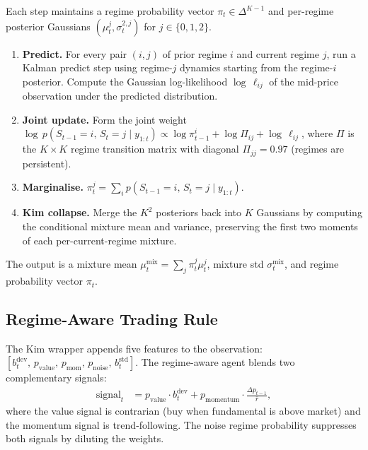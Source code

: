 \documentclass[11pt]{article}
\begin{document}
Each step maintains a regime probability vector
$\pi_t \in \Delta^{K-1}$ and per-regime posterior Gaussians
$(\mu_t^j, \sigma^{2,j}_t)$ for $j \in \{0,1,2\}$.

\begin{enumerate}[leftmargin=1.5em]
  \item \textbf{Predict.} For every pair $(i, j)$ of prior regime $i$ and
    current regime $j$, run a Kalman predict step using regime-$j$ dynamics
    starting from the regime-$i$ posterior.
    Compute the Gaussian log-likelihood $\log\,\ell_{ij}$ of the mid-price
    observation under the predicted distribution.
  \item \textbf{Joint update.} Form the joint weight
    $\log\,p(S_{t-1}=i,\, S_t=j \mid y_{1:t}) \propto
    \log\pi_{t-1}^i + \log\Pi_{ij} + \log\,\ell_{ij}$,
    where $\Pi$ is the $K \times K$ regime transition matrix with diagonal
    $\Pi_{jj} = 0.97$ (regimes are persistent).
  \item \textbf{Marginalise.}
    $\pi_t^j = \sum_i p(S_{t-1}=i,\, S_t=j \mid y_{1:t})$.
  \item \textbf{Kim collapse.} Merge the $K^2$ posteriors back into $K$
    Gaussians by computing the conditional mixture mean and variance,
    preserving the first two moments of each per-current-regime mixture.
\end{enumerate}

\noindent The output is a mixture mean $\mu_t^{\text{mix}} = \sum_j \pi_t^j \mu_t^j$,
mixture std $\sigma_t^{\text{mix}}$, and regime probability vector $\pi_t$.

\subsection{Regime-Aware Trading Rule}

The Kim wrapper appends five features to the observation:
$[b_t^{\text{dev}},\, p_{\text{value}},\, p_{\text{mom}},\, p_{\text{noise}},\, b_t^{\text{std}}]$.
The regime-aware agent blends two complementary signals:
\begin{align*}
\text{signal}_t &= p_{\text{value}} \cdot b_t^{\text{dev}}
                 + p_{\text{momentum}} \cdot \frac{\Delta p_{t-1}}{\bar{r}},
\end{align*}
where the value signal is contrarian (buy when fundamental is above market)
and the momentum signal is trend-following.
The noise regime probability suppresses both signals by diluting the weights.

\end{document}
